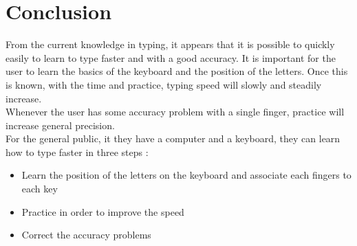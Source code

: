 \documentclass[12pt]{report}%
\newcommand\blankpage{%
    \null
    \thispagestyle{empty}%
    \addtocounter{page}{-1}%
    \newpage}
\begin{document}
\clearpage
\chapter{Conclusion}
From the current knowledge in typing, it appears that it is possible to quickly easily to learn to type faster and with a good accuracy. It is important for the user to learn the basics of the keyboard and the position of the letters. Once this is known, with the time and practice, typing speed will slowly and steadily increase.\\
Whenever the user has some accuracy problem with a single finger, practice will increase general precision.\\
For the general public, it they have a computer and a keyboard, they can learn how to type faster in three steps :
\begin{itemize}
	\item Learn the position of the letters on the keyboard and associate each fingers to each key
	\item Practice in order to improve the speed
	\item Correct the accuracy problems
\end{itemize}

\clearpage

\begin{flushleft}
	
	
\end{flushleft}

\clearpage
\afterpage{\blankpage}
\end{document}
